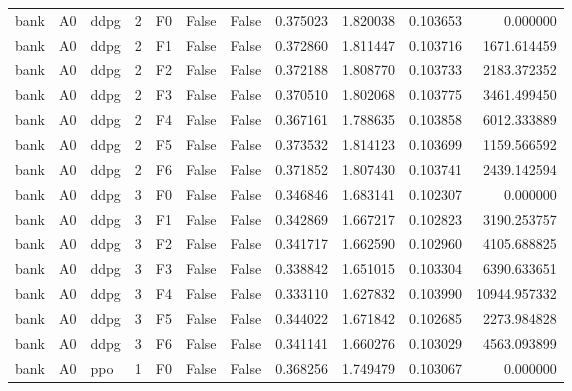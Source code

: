 \begin{tabular}{lllrlllrrrr}
      bank &      A0 &      ddpg &     2 &  F0 &           False &            False &  0.375023 &  1.820038 & 0.103653 &         0.000000 \\
      bank &      A0 &      ddpg &     2 &  F1 &           False &            False &  0.372860 &  1.811447 & 0.103716 &      1671.614459 \\
      bank &      A0 &      ddpg &     2 &  F2 &           False &            False &  0.372188 &  1.808770 & 0.103733 &      2183.372352 \\
      bank &      A0 &      ddpg &     2 &  F3 &           False &            False &  0.370510 &  1.802068 & 0.103775 &      3461.499450 \\
      bank &      A0 &      ddpg &     2 &  F4 &           False &            False &  0.367161 &  1.788635 & 0.103858 &      6012.333889 \\
      bank &      A0 &      ddpg &     2 &  F5 &           False &            False &  0.373532 &  1.814123 & 0.103699 &      1159.566592 \\
      bank &      A0 &      ddpg &     2 &  F6 &           False &            False &  0.371852 &  1.807430 & 0.103741 &      2439.142594 \\
      bank &      A0 &      ddpg &     3 &  F0 &           False &            False &  0.346846 &  1.683141 & 0.102307 &         0.000000 \\
      bank &      A0 &      ddpg &     3 &  F1 &           False &            False &  0.342869 &  1.667217 & 0.102823 &      3190.253757 \\
      bank &      A0 &      ddpg &     3 &  F2 &           False &            False &  0.341717 &  1.662590 & 0.102960 &      4105.688825 \\
      bank &      A0 &      ddpg &     3 &  F3 &           False &            False &  0.338842 &  1.651015 & 0.103304 &      6390.633651 \\
      bank &      A0 &      ddpg &     3 &  F4 &           False &            False &  0.333110 &  1.627832 & 0.103990 &     10944.957332 \\
      bank &      A0 &      ddpg &     3 &  F5 &           False &            False &  0.344022 &  1.671842 & 0.102685 &      2273.984828 \\
      bank &      A0 &      ddpg &     3 &  F6 &           False &            False &  0.341141 &  1.660276 & 0.103029 &      4563.093899 \\
      bank &      A0 &       ppo &     1 &  F0 &           False &            False &  0.368256 &  1.749479 & 0.103067 &         0.000000 \\

\end{tabular}
